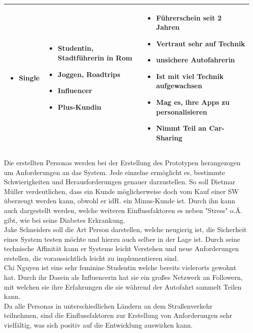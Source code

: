 \begin{center}
\begin{tabular}{| p{} | p{} | p{} |}
\begin{itemize}
			\item Single
		\end{itemize}
		&
		\begin{itemize}
			\item Studentin, Stadtführerin in Rom
			\item Joggen, Roadtrips
			\item Influencer
			\item Plus-Kundin
		\end{itemize}	
		& 
		\begin{itemize}
			\item Führerschein seit 2 Jahren
			\item Vertraut sehr auf Technik
			\item unsichere Autofahrerin
			\item Ist mit viel Technik aufgewachsen
			\item Mag es, ihre Apps zu personalisieren
			\item Nimmt Teil an Car-Sharing
		\end{itemize}
		\\
		\hline
	\end{tabular}
\end{center}
Die erstellten Personas werden bei der Erstellung des Prototypen herangezogen um Anforderungen an das System. Jede einzelne ermöglicht es, bestimmte Schwierigkeiten und Herausforderungen genauer darzustellen. So soll Dietmar Müller verdeutlichen, dass ein Kunde möglicherweise doch vom Kauf einer SW überzeugt werden kann, obwohl er idR. ein Minus-Kunde ist. Durch ihn kann auch dargestellt werden, welche weiteren Einflussfaktoren es neben "Stress" o.Ä. gibt, wie bei seine Diabetes Erkrankung.\\
Jake Schneiders soll die Art Person darstellen, welche neugierig ist, die Sicherheit eines System testen möchte und hierzu auch selber in der Lage ist. Durch seine technische Affinität kann er Systeme leicht Verstehen und neue Anforderungen erstellen, die voraussichtlich leicht zu implementieren sind.\\
Chi Nguyen ist eine sehr feminine Studentin welche bereits vielerorts gewohnt hat. Durch ihr Dasein als Influencerin hat sie ein großes Netzwerk an Followern, mit welchen sie ihre Erfahrungen die sie während der Autofahrt sammelt Teilen kann. \\
Da alle Personas in unterschiedlichen Ländern an dem Straßenverkehr teilnehmen, sind die Einflussfaktoren zur Erstellung von Anforderungen sehr vielfältig, was sich positiv auf die Entwicklung auswirken kann.

